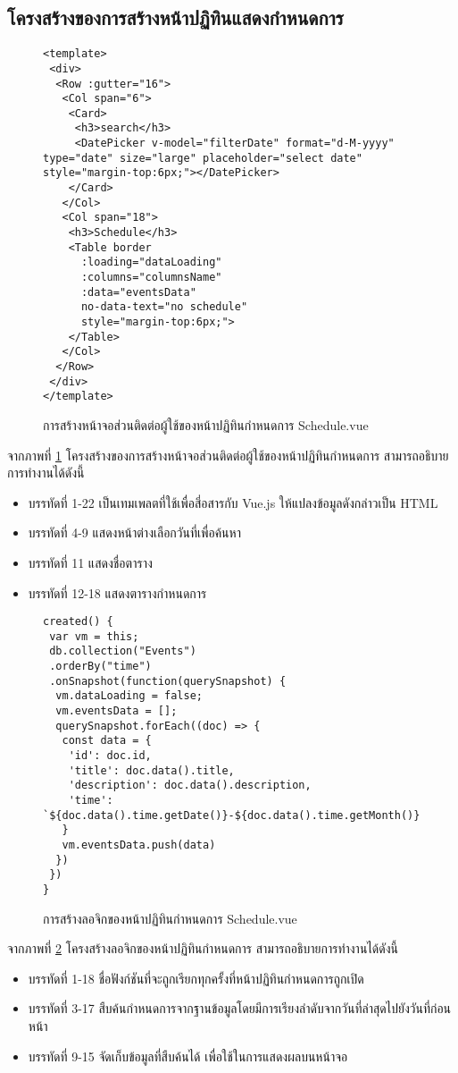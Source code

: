 	\subsection{โครงสร้างของการสร้างหน้าปฏิทินแสดงกำหนดการ}
	\begin{figure}[H]
		{\begin{lstlisting}
<template>
 <div>
  <Row :gutter="16">
   <Col span="6">
    <Card>
     <h3>search</h3>
     <DatePicker v-model="filterDate" format="d-M-yyyy" type="date" size="large" placeholder="select date" style="margin-top:6px;"></DatePicker> 
    </Card>
   </Col>
   <Col span="18"> 
    <h3>Schedule</h3>
    <Table border 
      :loading="dataLoading" 
      :columns="columnsName" 
      :data="eventsData"
      no-data-text="no schedule"
      style="margin-top:6px;">
    </Table> 
   </Col>
  </Row>
 </div>
</template>
			\end{lstlisting}}
		\caption{การสร้างหน้าจอส่วนติดต่อผู้ใช้ของหน้าปฏิทินกำหนดการ Schedule.vue}
		\label{Fig:Schedule}
	\end{figure}
	จากภาพที่ \ref{Fig:Schedule} โครงสร้างของการสร้างหน้าจอส่วนติดต่อผู้ใช้ของหน้าปฏิทินกำหนดการ สามารถอธิบายการทำงานได้ดังนี้
	\begin{itemize}[label={--}]
		\item บรรทัดที่ 1-22  เป็นเทมเพลตที่ใช้เพื่อสี่อสารกับ Vue.js ให้แปลงข้อมูลดังกล่าวเป็น HTML
		\item บรรทัดที่ 4-9 แสดงหน้าต่างเลือกวันที่เพื่อค้นหา
		\item บรรทัดที่ 11 แสดงชื่อตาราง
		\item บรรทัดที่ 12-18 แสดงตารางกำหนดการ
	\end{itemize}
	\begin{figure}[H]
		{\begin{lstlisting}
created() {
 var vm = this;
 db.collection("Events")
 .orderBy("time")
 .onSnapshot(function(querySnapshot) {
  vm.dataLoading = false;
  vm.eventsData = [];
  querySnapshot.forEach((doc) => {
   const data = {
    'id': doc.id,
    'title': doc.data().title,
    'description': doc.data().description,
    'time': `${doc.data().time.getDate()}-${doc.data().time.getMonth()}-${doc.data().time.getFullYear()}`
   }
   vm.eventsData.push(data)
  })
 })
}
			\end{lstlisting}}
		\caption{การสร้างลอจิกของหน้าปฏิทินกำหนดการ Schedule.vue}
		\label{Fig:ScheduleJs}
	\end{figure}
	จากภาพที่ \ref{Fig:ScheduleJs} โครงสร้างลอจิกของหน้าปฏิทินกำหนดการ สามารถอธิบายการทำงานได้ดังนี้
	\begin{itemize}[label={--}]
		\item บรรทัดที่ 1-18 ชื่อฟังก์ชันที่จะถูกเรียกทุกครั้งที่หน้าปฏิทินกำหนดการถูกเปิด
		\item บรรทัดที่ 3-17 สืบค้นกำหนดการจากฐานข้อมูลโดยมีการเรียงลำดับจากวันที่ล่าสุดไปยังวันที่ก่อนหน้า
		\item บรรทัดที่ 9-15 จัดเก็บข้อมูลที่สืบค้นได้ เพื่อใช้ในการแสดงผลบนหน้าจอ
	\end{itemize}
	
